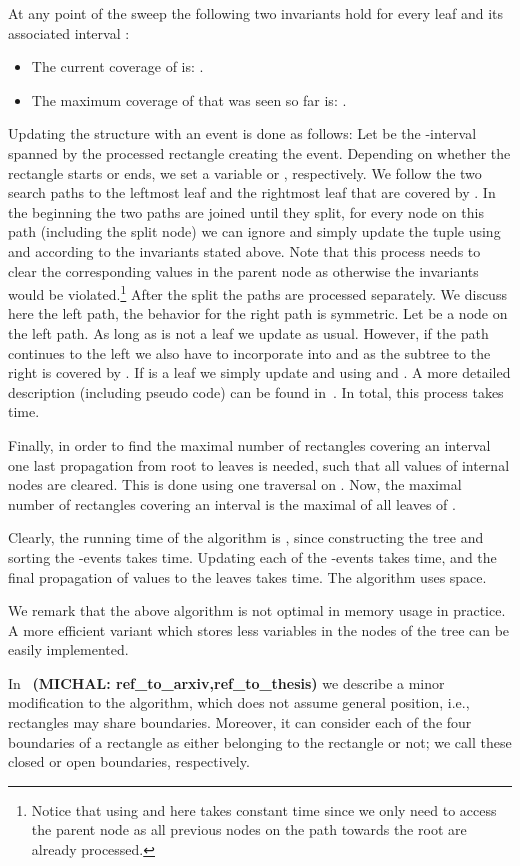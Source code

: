 {{\noindent
At any point of the sweep the following two invariants hold for every leaf 
and its associated interval :
\begin{itemize}
    \item
    The current coverage of  is: .
    \item
    The maximum coverage of  that was seen so far is: .
\end{itemize}

\noindent
Updating the structure with an event is done as follows:
Let  be the -interval spanned by the processed rectangle creating the event.
Depending on whether the rectangle starts or ends,
we set a variable  or , respectively.
We follow the two search paths to the leftmost leaf and the rightmost leaf that are covered by .
In the beginning the two paths are joined until they split, for every node  on this path
(including the split node) we can ignore  and simply
update the tuple  using  and 
according to the invariants stated above. Note that this process needs to clear the
corresponding values in the parent node as otherwise the invariants would be violated.\footnote{Notice that using  and  here
takes constant time since we only need to access the parent
node as all previous nodes on the path towards the root are already processed.}
After the split the paths are processed separately.
We discuss here the left path, the behavior for the right path is symmetric.
Let  be a node on the left path.
As long as  is not a leaf we update  as usual.
However, if the path continues to the left we also have to incorporate  into
 and  as the subtree to the right is covered by .
If  is a leaf we simply update  and  using  and .
A more detailed description (including pseudo code) can be found in~\cite{as-cdaaa-13}.
In total, this process takes  time.

Finally, in order to find the maximal number of rectangles covering
an interval one last propagation from root to leaves is needed, such that
all  values of internal nodes are cleared. This is done using one
traversal on .
Now, the maximal number of rectangles covering an interval
is the maximal  of all leaves of .

Clearly, the running time of the algorithm is ,
since constructing the tree and sorting the -events takes
 time. Updating each of the  -events takes 
time, and the final propagation of values to the leaves takes  time.
The algorithm uses  space.

We remark that the above algorithm is not optimal in
memory usage in practice. A more efficient variant which stores less variables
in the nodes of the tree can be easily implemented.
}
{
In~\cite{} \textbf{(MICHAL: ref_to_arxiv,ref_to_thesis)}
we describe a minor modification to the algorithm,
which does not assume general position,
i.e., rectangles may share boundaries.
Moreover, it can consider each of the four boundaries
of a rectangle as either belonging to the rectangle or not; we call these closed or open boundaries, respectively.
}
}

